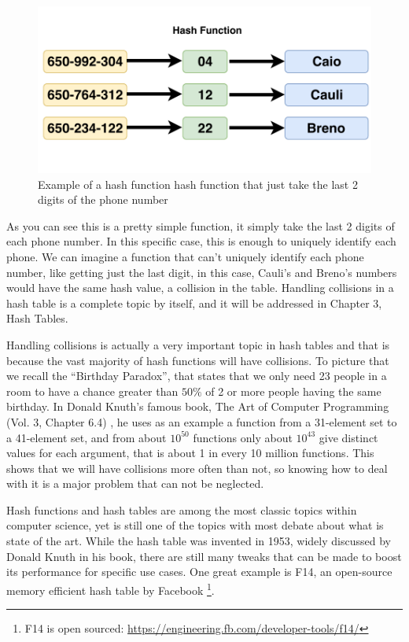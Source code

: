 \bigskip

\begin{figure}[h!]
  \centering
  \includegraphics[width=12cm]{figuras/phone-hash-example.pdf}
  \caption{Example of a hash function hash function that just take the last 2 digits of the phone number }
\end{figure}

\medskip

As you can see this is a pretty simple function, it simply take the last 2 digits of each phone number. In this specific case, this is enough to uniquely identify each phone. We can imagine a function that can't uniquely identify each phone number, like getting just the last digit, in this case, Cauli's and Breno's numbers would have the same hash value, a collision in the table. Handling collisions in a hash table is a complete topic by itself, and it will be addressed in Chapter 3, Hash Tables. 

Handling collisions is actually a very important topic in hash tables and that is because the vast majority of hash functions will have collisions. To picture that we recall the ``Birthday Paradox'', that states that we only need 23 people in a room to have a chance greater than \( 50\% \) of 2 or more people having the same birthday. In Donald Knuth's famous book, The Art of Computer Programming (Vol. 3, Chapter 6.4) \citep{TAOCP3}, he uses as an example a function from a 31-element set to a 41-element set, and from about \( 10^{50} \) functions only about \( 10^{43} \) give distinct values for each argument, that is about 1 in every 10 million functions. This shows that we will have collisions more often than not, so knowing how to deal with it is a major problem that can not be neglected.

Hash functions and hash tables are among the most classic topics within computer science, yet is still one of the topics with most debate about what is state of the art. While the hash table was invented in 1953, widely discussed by Donald Knuth in his book, there are still many tweaks that can be made to boost its performance for specific use cases. One great example is F14, an open-source memory efficient hash table by Facebook \footnote{F14 is open sourced: \url{https://engineering.fb.com/developer-tools/f14/}}.

